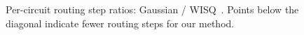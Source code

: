 \begin{figure}[t]
    \centering
    \figslot{1.6in}
    \caption{Per-circuit routing step ratios: Gaussian / WISQ~\cite{wisq}.
    Points below the diagonal indicate fewer routing steps for our method.
    }
    \label{fig:scatter}
    \vspace{-0.2cm}
\end{figure}
